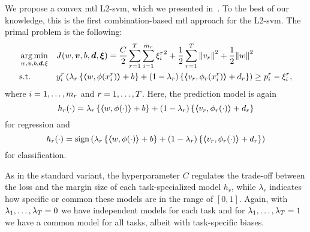 We propose a convex \acrshort{mtl} L2-\acrshort{svm}, which we presented in~\cite{RuizAD21}. To the best of our knowledge, this is the first combination-based \acrshort{mtl} approach for the L2-\acrshort{svm}. The primal problem is the following:
\begin{equation}\label{eq:svmmtl_primal_convex_l2}
    \begin{aligned}
    & \argmin_{w, \fv{v}, b, \fv{d}, \xi}
    & & {J({w}, \fv{v}, b, \fv{d}, \fv{\xi}) = \frac{C}{2} \sum_{r= 1}^T \sum_{i=1}^{m_r} {\xi_{i}^r}^2 + \frac{1}{2} \sum_{r= 1}^T{\norm{{v}_r}^2} + \frac{1}{2} {\norm{{w}}}^2} \\
    & \text{s.t.}
    & & y_{i}^r \left(\lambda_r \left\lbrace \dotp{w}{\phi(x_{i}^r)} + b  \right\rbrace + (1 - \lambda_r) \left\lbrace \dotp{{v}_r}{\phi_r(x_{i}^r)} + d_r \right\rbrace  \right) \geq p_{i}^r - \xi_{i}^r ,  \\
    \end{aligned}
\end{equation}
where $i=1, \ldots, m_r$ and $r=1, \ldots, T$.
Here, the prediction model is again
\begin{equation}
    \nonumber
    h_r(\cdot) = \lambda_r \left\lbrace \bm{\left\langle} w, \phi(\cdot) \bm{\right\rangle} + b  \right\rbrace + (1 - \lambda_r) \left\lbrace \bm{\left\langle} {v}_r, \phi_r(\cdot) \bm{\right\rangle} + d_r \right\rbrace
\end{equation}
for regression and 
\begin{equation}
    \nonumber
    h_r(\cdot) = \operatorname{sign}{ \left(\lambda_r \left\lbrace \bm{\left\langle} w, \phi(\cdot) \bm{\right\rangle} + b  \right\rbrace + (1 - \lambda_r) \left\lbrace \bm{\left\langle} {v}_r, \phi_r(\cdot) \bm{\right\rangle} + d_r \right\rbrace \right)}
\end{equation}
for classification.
%

As in the standard variant, the hyperparameter $C$ regulates the trade-off between the loss and the margin size of each task-specialized model $h_r$, while $\lambda_r$ indicates how specific or common these models are in the range of $[0, 1]$. Again, with $\lambda_1, \ldots, \lambda_T=0$ we have independent models for each task and for $\lambda_1, \ldots, \lambda_T=1$ we have a common model for all tasks, albeit with task-specific biases. 
 


